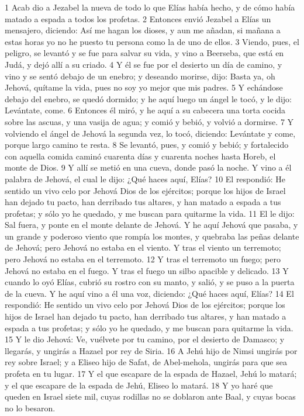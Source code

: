 1 Acab dio a Jezabel la nueva de todo lo que Elías había hecho, y de cómo había matado a espada a todos los profetas.
2 Entonces envió Jezabel a Elías un mensajero, diciendo: Así me hagan los dioses, y aun me añadan, si mañana a estas horas yo no he puesto tu persona como la de uno de ellos.
3 Viendo, pues, el peligro, se levantó y se fue para salvar su vida, y vino a Beerseba, que está en Judá, y dejó allí a su criado.
4 Y él se fue por el desierto un día de camino, y vino y se sentó debajo de un enebro; y deseando morirse, dijo: Basta ya, oh Jehová, quítame la vida, pues no soy yo mejor que mis padres.
5 Y echándose debajo del enebro, se quedó dormido; y he aquí luego un ángel le tocó, y le dijo: Levántate, come.
6 Entonces él miró, y he aquí a su cabecera una torta cocida sobre las ascuas, y una vasija de agua; y comió y bebió, y volvió a dormirse.
7 Y volviendo el ángel de Jehová la segunda vez, lo tocó, diciendo: Levántate y come, porque largo camino te resta.
8 Se levantó, pues, y comió y bebió; y fortalecido con aquella comida caminó cuarenta días y cuarenta noches hasta Horeb, el monte de Dios.
9 Y allí se metió en una cueva, donde pasó la noche. Y vino a él palabra de Jehová, el cual le dijo: ¿Qué haces aquí, Elías?
10 El respondió: He sentido un vivo celo por Jehová Dios de los ejércitos; porque los hijos de Israel han dejado tu pacto, han derribado tus altares, y han matado a espada a tus profetas; y sólo yo he quedado, y me buscan para quitarme la vida. 
11 El le dijo: Sal fuera, y ponte en el monte delante de Jehová. Y he aquí Jehová que pasaba, y un grande y poderoso viento que rompía los montes, y quebraba las peñas delante de Jehová; pero Jehová no estaba en el viento. Y tras el viento un terremoto; pero Jehová no estaba en el terremoto.
12 Y tras el terremoto un fuego; pero Jehová no estaba en el fuego. Y tras el fuego un silbo apacible y delicado.
13 Y cuando lo oyó Elías, cubrió su rostro con su manto, y salió, y se puso a la puerta de la cueva. Y he aquí vino a él una voz, diciendo: ¿Qué haces aquí, Elías?
14 El respondió: He sentido un vivo celo por Jehová Dios de los ejércitos; porque los hijos de Israel han dejado tu pacto, han derribado tus altares, y han matado a espada a tus profetas; y sólo yo he quedado, y me buscan para quitarme la vida. 
15 Y le dio Jehová: Ve, vuélvete por tu camino, por el desierto de Damasco; y llegarás, y ungirás a Hazael por rey de Siria. 
16 A Jehú hijo de Nimsi ungirás por rey sobre Israel; y a Eliseo hijo de Safat, de Abel-mehola, ungirás para que sea profeta en tu lugar.
17 Y el que escapare de la espada de Hazael, Jehú lo matará; y el que escapare de la espada de Jehú, Eliseo lo matará.
18 Y yo haré que queden en Israel siete mil, cuyas rodillas no se doblaron ante Baal, y cuyas bocas no lo besaron.
